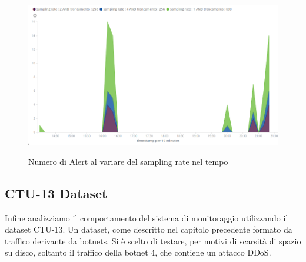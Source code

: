 \documentclass[12pt,a4paper,openright,twoside]{report}
\begin{document}
\begin{figure}[h!]
\begin{center}                          %
  \includegraphics[width=\textwidth]{images/DARPA-time.png}
  \caption{Numero di Alert al variare del sampling rate nel tempo}\label{darpa:time}
  \label{}
\end{center}
\end{figure}

\clearpage

\subsection{CTU-13 Dataset}

Infine analizziamo il comportamento del sistema di monitoraggio utilizzando il dataset
CTU-13. Un dataset, come descritto nel capitolo precedente formato da traffico derivante
da botnets. Si \`e scelto di testare, per motivi di scarsit\`a di spazio su disco, soltanto il traffico della
botnet 4, che contiene un attacco DDoS.
\end{document}

